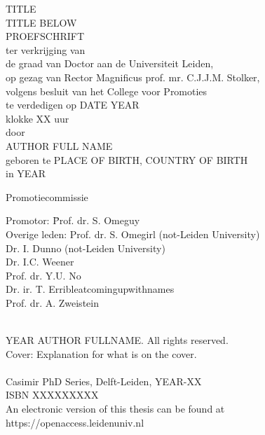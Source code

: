 \begin{center}
{\Huge TITLE}\\
\vspace{2cm}
{\huge TITLE BELOW} \\
\vspace{5cm}
PROEFSCHRIFT\\
\vspace{1cm}
ter verkrijging van\\
de graad van Doctor aan de Universiteit Leiden,\\
op gezag van Rector Magnificus prof. mr. C.J.J.M. Stolker,\\
volgens besluit van het College voor Promoties\\
te verdedigen op DATE YEAR\\
klokke XX uur \\
\vspace{1cm}
door\\
\vspace{1cm}
{\huge AUTHOR FULL NAME}\\
\vspace{0.5cm}
geboren te PLACE OF BIRTH, COUNTRY OF BIRTH \\ in YEAR
\end{center}


\clearpage
\noindent
Promotiecommissie \\[0.3cm]
\begin{tabbing}
Promotor: \hspace{0.6cm} \= Prof. dr. S. Omeguy\\
Overige leden: \>Prof. dr. S. Omegirl (not-Leiden University)\\
\>Dr. I. Dunno (not-Leiden University)\\
\>Dr. I.C. Weener\\
\>Prof. dr. Y.U. No\\
\>Dr. ir. T. Erribleatcomingupwithnames\\
\>Prof. dr. A. Zweistein\\

\end{tabbing}


\vfill
\noindent
\\
\textcopyright  YEAR AUTHOR FULLNAME. All rights reserved. \\
Cover: Explanation for what is on the cover. \\
\\
Casimir PhD Series, Delft-Leiden, YEAR-XX \\
ISBN XXXXXXXXX \\
An electronic version of this thesis can be found at \\
https://openaccess.leidenuniv.nl\\[0.2cm]

